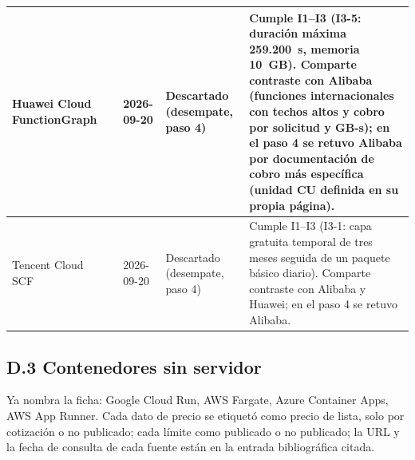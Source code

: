 \documentclass[12pt, letterpaper, table, xcdraw]{inf-pucv}
\begin{document}
{\begin{longtable}{|p{2.5cm}|p{2.4cm}|p{1.4cm}|p{2.3cm}|p{5.2cm}|}
    Huawei Cloud FunctionGraph & \parencite{huawei2026functiongraphprice,huawei2026functiongraphlimits} & 2026-09-20 & Descartado (desempate, paso 4) & Cumple I1--I3 (I3-5: duración máxima 259.200~s, memoria 10~GB). Comparte contraste con Alibaba (funciones internacionales con techos altos y cobro por solicitud y GB-s); en el paso 4 se retuvo Alibaba por documentación de cobro más específica (unidad CU definida en su propia página). \\ \hline
    Tencent Cloud SCF & \parencite{tencent2026scfpricing,tencent2026scffreetier,tencent2026scfquotas} & 2026-09-20 & Descartado (desempate, paso 4) & Cumple I1--I3 (I3-1: capa gratuita temporal de tres meses seguida de un paquete básico diario). Comparte contraste con Alibaba y Huawei; en el paso 4 se retuvo Alibaba. \\ \hline
\end{longtable}
}

\subsection*{D.3 Contenedores sin servidor}

Ya nombra la ficha: Google Cloud Run, AWS Fargate, Azure Container Apps, AWS App Runner. Cada dato de precio se etiquetó como precio de lista, solo por cotización o no publicado; cada límite como publicado o no publicado; la URL y la fecha de consulta de cada fuente están en la entrada bibliográfica citada.
\end{document}
